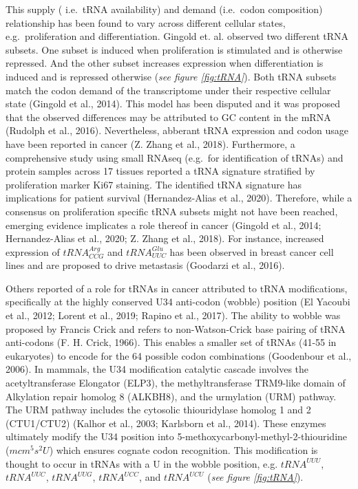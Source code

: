 \documentclass[12pt,openany]{book}
\begin{document}
This supply ( i.e.~tRNA availability) and demand (i.e.~codon
composition) relationship has been found to vary across different
cellular states, e.g.~proliferation and differentiation. Gingold et. al.
observed two different tRNA subsets. One subset is induced when
proliferation is stimulated and is otherwise repressed. And the other
subset increases expression when differentiation is induced and is
repressed otherwise (\emph{see figure \ref{fig:tRNA}}). Both tRNA
subsets match the codon demand of the transcriptome under their
respective cellular state (Gingold et al., 2014). This model has been
disputed and it was proposed that the observed differences may be
attributed to GC content in the mRNA (Rudolph et al., 2016).
Nevertheless, abberant tRNA expression and codon usage have been
reported in cancer (Z. Zhang et al., 2018). Furthermore, a comprehensive
study using small RNAseq (e.g.~for identification of tRNAs) and protein
samples across 17 tissues reported a tRNA signature stratified by
proliferation marker Ki67 staining. The identified tRNA signature has
implications for patient survival (Hernandez-Alias et al., 2020).
Therefore, while a consensus on proliferation specific tRNA subsets
might not have been reached, emerging evidence implicates a role thereof
in cancer (Gingold et al., 2014; Hernandez-Alias et al., 2020; Z. Zhang
et al., 2018). For instance, increased expression of
\(tRNA_{CCG}^{Arg}\) and \(tRNA_{UUC}^{Glu}\) has been observed in
breast cancer cell lines and are proposed to drive metastasis (Goodarzi
et al., 2016).

Others reported of a role for tRNAs in cancer attributed to tRNA
modifications, specifically at the highly conserved U34 anti-codon
(wobble) position (El Yacoubi et al., 2012; Lorent et al., 2019; Rapino
et al., 2017). The ability to wobble was proposed by Francis Crick and
refers to non-Watson-Crick base pairing of tRNA anti-codons (F. H.
Crick, 1966). This enables a smaller set of tRNAs (41-55 in eukaryotes)
to encode for the 64 possible codon combinations (Goodenbour et al.,
2006). In mammals, the U34 modification catalytic cascade involves the
acetyltransferase Elongator (ELP3), the methyltransferase TRM9-like
domain of Alkylation repair homolog 8 (ALKBH8), and the urmylation (URM)
pathway. The URM pathway includes the cytosolic thiouridylase homolog 1
and 2 (CTU1/CTU2) (Kalhor et al., 2003; Karlsborn et al., 2014). These
enzymes ultimately modify the U34 position into
5-methoxycarbonyl-methyl-2-thiouridine (\(mcm^5s^2U\)) which ensures
cognate codon recognition. This modification is thought to occur in
tRNAs with a U in the wobble position, e.g. \(tRNA^{UUU}\),
\(tRNA^{UUC}\), \(tRNA^{UUG}\), \(tRNA^{UCC}\), and \(tRNA^{UCU}\)
(\emph{see figure \ref{fig:tRNA}}).
\end{document}
